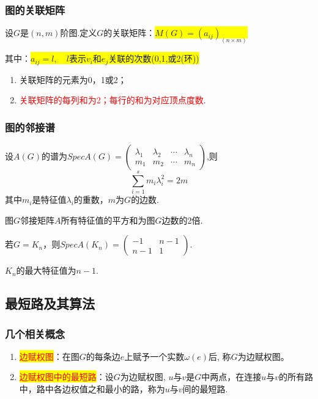 \subsubsection{图的关联矩阵}
\begin{definition}
	设$G$是$(n,m)$阶图.定义$G$的关联矩阵：\colorbox{yellow}{$M(G)=(a_{ij})_{(n\times m)}$}
	
	其中：\colorbox{yellow}{$a_{ij}=l, \quad l$表示$v_i$和$e_j$关联的次数(0,1,或2(环))}
\end{definition}
\noindent {\bfseries \textcolor{ecolor}{性质：}}
\begin{enumerate}
	\item 关联矩阵的元素为0，1或2；
	\item \textcolor{red}{关联矩阵的每列和为2；每行的和为对应顶点度数}.
\end{enumerate}

\subsubsection{图的邻接谱}
\begin{theorem}
	设$A(G)$的谱为$Spec A(G)=\begin{pmatrix}
		\lambda_1 &\lambda_2&\cdots & \lambda_n\\
		m_1&m_2&\cdots & m_n
	\end{pmatrix}$,则
\[
\sum\limits_{i=1}^{s}m_i\lambda_i^2=2m
\]其中$m_i$是特征值$\lambda_i$的重数，$m$为$G$的边数.
\end{theorem}
\begin{note}
	图$G$邻接矩阵$A$所有特征值的平方和为图$G$边数的2倍.
\end{note}
\begin{example}
	若$G=K_n$，则$Spec A(K_n)=\begin{pmatrix}
		-1 &n-1\\
		n-1&1
	\end{pmatrix}$.
\end{example}
\begin{note}
$K_n$的最大特征值为$n-1$.	
\end{note}


\subsection{最短路及其算法}
\subsubsection{几个相关概念}
\begin{enumerate}
	\item \colorbox{yellow}{\textcolor{red}{边赋权图}}：在图$G$的每条边$e$上赋予一个实数$\omega(e)$后, 称$G$为边赋权图。
	\item \colorbox{yellow}{\textcolor{red}{边赋权图中的最短路}}：设$G$为边赋权图, $u$与$v$是$G$中两点，在连接$u$与$v$的所有路中，路中各边权值之和最小的路，称为$u$与$v$间的最短路.
\end{enumerate}

